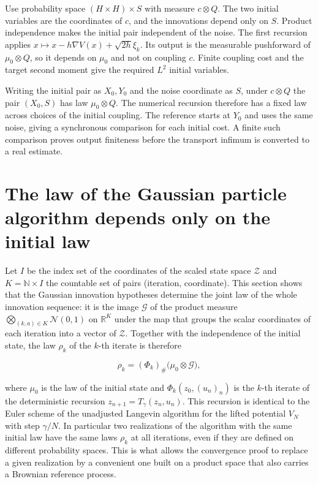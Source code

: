 \documentclass[11pt,a4paper]{report}
\begin{document}
Use probability space \((H\times H)\times S\) with measure \(c\otimes Q\). The two initial variables are the coordinates of \(c\), and the innovations depend only on \(S\). Product independence makes the initial pair independent of the noise. The first recursion applies \(x\mapsto x-h\nabla V(x)+\sqrt{2h}\xi_k\). Its output is the measurable pushforward of \(\mu_0\otimes Q\), so it depends on \(\mu_0\) and not on coupling \(c\). Finite coupling cost and the target second moment give the required \(L^2\) initial variables.



Writing the initial pair as \(X_0,Y_0\) and the noise coordinate as \(S\), under \(c\otimes Q\) the pair \((X_0,S)\) has law \(\mu_0\otimes Q\). The numerical recursion therefore has a fixed law across choices of the initial coupling. The reference starts at \(Y_0\) and uses the same noise, giving a synchronous comparison for each initial cost. A finite such comparison proves output finiteness before the transport infimum is converted to a real estimate.


\section{\texorpdfstring{The law of the Gaussian particle algorithm depends only on the initial law}{The law of the Gaussian particle algorithm depends only on the initial law}}
\label{proof-module-IPLA-AlgorithmLaw-lean}


Let \(I\) be the index set of the coordinates of the scaled state space \(\mathcal Z\) and \(K=\mathbb N\times I\) the countable set of pairs (iteration, coordinate). This section shows that the Gaussian innovation hypotheses determine the joint law of the whole innovation sequence: it is the image \(\mathcal G\) of the product measure \(\bigotimes_{(k,a)\in K}\mathcal N(0,1)\) on \(\mathbb R^K\) under the map that groups the scalar coordinates of each iteration into a vector of \(\mathcal Z\). Together with the independence of the initial state, the law \(\rho_k\) of the \(k\)-th iterate is therefore


\[\rho_k=(\Phi_k)_\#\bigl(\mu_0\otimes\mathcal G\bigr),\]


where \(\mu_0\) is the law of the initial state and \(\Phi_k(z_0,(u_n)_n)\) is the \(k\)-th iterate of the deterministic recursion \(z_{n+1}=T_\gamma(z_n,u_n)\). This recursion is identical to the Euler scheme of the unadjusted Langevin algorithm for the lifted potential \(V_N\) with step \(\gamma/N\). In particular two realizations of the algorithm with the same initial law have the same laws \(\rho_k\) at all iterations, even if they are defined on different probability spaces. This is what allows the convergence proof to replace a given realization by a convenient one built on a product space that also carries a Brownian reference process.
\end{document}
